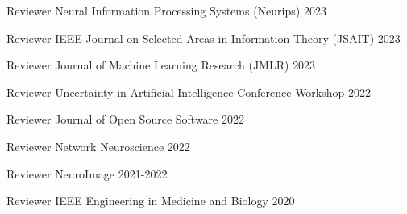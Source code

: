 \begin{cventries}
    \cventry
    {Reviewer} %
    {Neural Information Processing Systems (Neurips)} %
    {} %
    {2023} %
    {\empty}
    \vspace{-\baselineskip}

    \cventry
    {Reviewer} %
    {IEEE Journal on Selected Areas in Information Theory (JSAIT)} %
    {} %
    {2023} %
    {\empty}
    \vspace{-\baselineskip}

    \cventry
    {Reviewer} %
    {Journal of Machine Learning Research (JMLR)} %
    {} %
    {2023} %
    {\empty}
    \vspace{-\baselineskip}

    \cventry
    {Reviewer} %
    {Uncertainty in Artificial Intelligence Conference Workshop} %
    {} %
    {2022} %
    {\empty}
    \vspace{-\baselineskip}
    
\cventry
    {Reviewer} %
    {Journal of Open Source Software} %
    {} %
    {2022} %
    {\empty}
    \vspace{-\baselineskip}
    
\cventry
    {Reviewer} %
    {Network Neuroscience} %
    {} %
    {2022} %
    {\empty}
    \vspace{-\baselineskip}
    
\cventry
    {Reviewer} %
    {NeuroImage} %
    {} %
    {2021-2022} %
    {\empty}
    \vspace{-\baselineskip}
    
  \cventry
    {Reviewer} %
    {IEEE Engineering in Medicine and Biology} %
    {} %
    {2020} %
    {\empty}
    \vspace{-\baselineskip}
\end{cventries}
